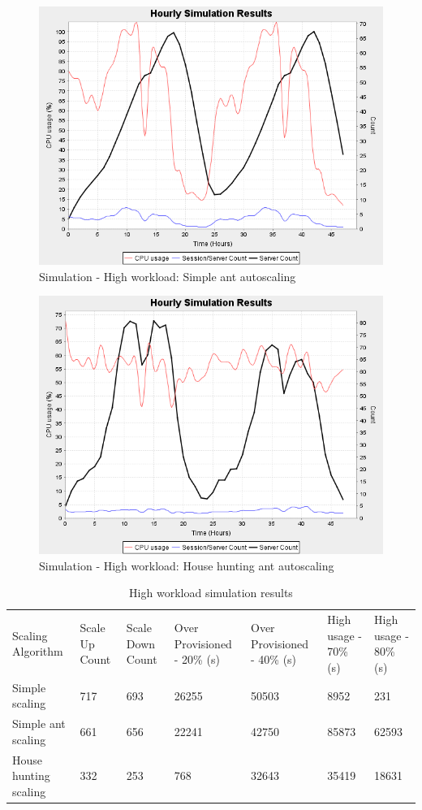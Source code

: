 \documentclass[conference]{IEEEtran}
\begin{document}
\begin{figure}
	\centering
		\includegraphics[width=0.75\columnwidth]{results/sim2/sim2-antSimplestats.png}
	\caption{Simulation - High workload: Simple ant autoscaling}
	\label{fig:sim2-antSimplestats}
\end{figure}

\begin{figure}
	\centering
		\includegraphics[width=0.75\columnwidth]{results/sim2/sim2-antHHstats.png}
	\caption{Simulation - High workload: House hunting ant autoscaling}
	\label{fig:sim2-antHHstats}
\end{figure}

\begin{table}
\caption{High workload simulation results}
\label{table:sim2}
\begin{tabu} to\linewidth{|X[c]|X[c]|X[c]|X[c]|X[c]|X[c]|X[c]|}
\everyrow{\hline}
\hline
Scaling Algorithm & Scale Up Count & Scale Down Count & Over Provisioned - 20\% (s) & Over Provisioned - 40\% (s) & High usage - 70\% (s) & High usage - 80\% (s) \\
Simple scaling & 717 & 693 & 26255 & 50503 & 8952 & 231 \\
Simple ant scaling & 661 & 656 & 22241 & 42750 & 85873 & 62593 \\
House hunting scaling & 332 & 253 & 768 & 32643 & 35419 & 18631 \\
\end{tabu}
\end{table}
\end{document}
